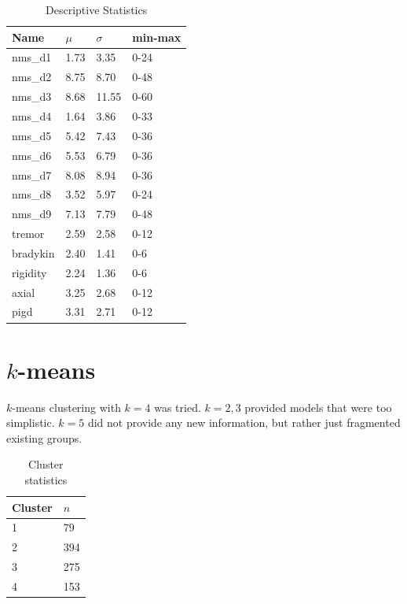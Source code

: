 \documentclass[letterpaper,12pt]{article}
\begin{document}
\begin{table}[h]
  \centering
  \begin{tabular}{l|l|l|l}
  Name  &       $\mu$ & $\sigma$ & min-max \\
         \hline
nms\_d1&   1.73&  3.35&   0-24 \\
nms\_d2&   8.75&  8.70&   0-48 \\
nms\_d3&   8.68& 11.55&   0-60 \\
nms\_d4&   1.64&  3.86&   0-33 \\
nms\_d5&   5.42&  7.43&   0-36 \\
nms\_d6&   5.53&  6.79&   0-36 \\
nms\_d7&   8.08&  8.94&   0-36 \\
nms\_d8&   3.52&  5.97&   0-24 \\
nms\_d9&   7.13&  7.79&   0-48 \\
tremor&   2.59&  2.58&   0-12 \\
bradykin& 2.40&  1.41&   0-6 \\
rigidity& 2.24&  1.36&   0-6 \\
axial&    3.25&  2.68&   0-12 \\
pigd&     3.31&  2.71&   0-12 \\
  \end{tabular}
  \caption{Descriptive Statistics}
  \label{tab:descriptive-statistics}
\end{table}

\section{$k$-means}

$k$-means clustering with $k = 4$ was tried. $k = 2, 3$ provided models that
were too simplistic. $k = 5$ did not provide any new information, but rather
just fragmented existing groups.

\begin{table}[h]
  \centering
  \caption{Cluster statistics}
  \label{tab:cluster_stats}
  \begin{tabular}{l|l}
    Cluster & $n$ \\
    \hline
    1 & 79 \\
    2 & 394 \\
    3 & 275 \\
    4 & 153 \\
  \end{tabular}
\end{table}
\end{document}
